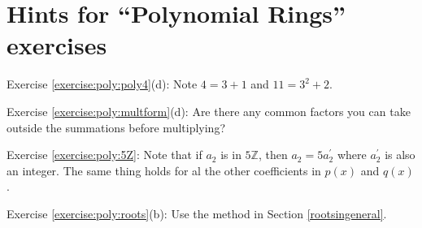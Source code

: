 \section{Hints for ``Polynomial Rings'' exercises}
\label{sec:polyrings:hints} 

\noindent Exercise \ref{exercise:poly:poly4}(d):  Note $4=3+1$ and $11=3^2+2$.

\noindent Exercise \ref{exercise:poly:multform}(d): Are there any common factors you can take outside 
the summations before multiplying?

\noindent Exercise \ref{exercise:poly:5Z}:  Note that if  $a_2$ is in $5\mathbb{Z}$, then $a_2 = 5a_2^{\prime}$ where $a_2^{\prime}$ is also an integer.
The same thing holds for al the other coefficients in $p(x)$ and $q(x)$.

\noindent Exercise \ref{exercise:poly:roots}(b):  Use the method in Section \ref{rootsingeneral}.
 